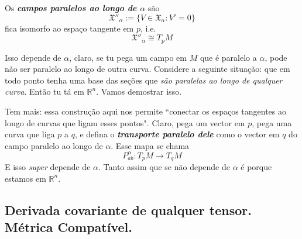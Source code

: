 Os \textit{\textbf{campos paralelos ao longo de \(\alpha\)}} são
\[\mathfrak{X}''_\alpha:=\{V \in \mathfrak{X}_\alpha:V'=0\}\]
fica isomorfo ao espaço tangente em \(p\), i.e.
\[\mathfrak{X}''_\alpha \cong T_pM\]
\begin{remark}\leavevmode
Isso depende de \(\alpha\), claro, se tu pega um campo em \(M\) que é paralelo a \(\alpha\), pode não ser paralelo ao longo de outra curva. Considere a seguinte situação: que em todo ponto tenha uma base das seções que \textit{são paralelas ao longo de qualquer curva}. Então tu tá em \(\mathbb{R}^n\). Vamos demostrar isso.
\end{remark}

Tem mais: essa construção aqui nos permite ``conectar os espaços tangentes ao longo de curvas que ligam esses pontos". Claro, pega um vector em \(p\), pega uma curva que liga \(p\) a \(q\), e defina o \textit{\textbf{transporte paralelo dele}} como o vector em \(q\) do campo paralelo ao longo de  \(\alpha\). Esse mapa se chama
\[P_{ab}^\alpha:T_pM \to T_q M\]
E isso \textit{super} depende de \(\alpha\). Tanto assim que se não depende de \(\alpha\) é porque estamos em \(\mathbb{R}^n\).

\subsection{Derivada covariante de qualquer tensor. Métrica Compatível.}

